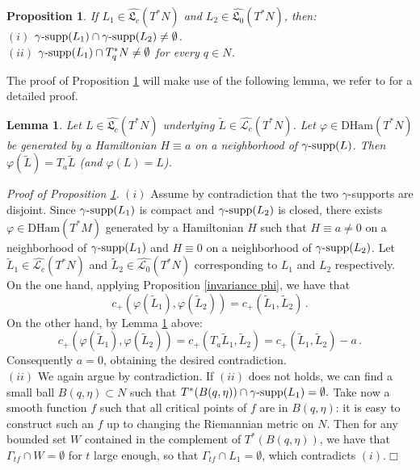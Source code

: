 \documentclass{article}
\newcommand{\1}{\mathbbm{1}}
\newtheorem{lem}[thm]{Lemma}
\newtheorem{prp}[thm]{Proposition}
\theoremstyle{remark}
\begin{document}
{{\begin{prp} \label{no empty}
If $L_1 \in \widehat{\mathfrak{L}_c}(T^*N)$ and $L_2 \in \widehat{\mathfrak{L}_0}(T^*N)$, then: \\
$(i)$ $\gamma\textnormal{-supp}(L_1) \cap \gamma\textnormal{-supp}(L_2) \ne \emptyset$. \\
$(ii)$ $\gamma\textnormal{-supp}(L_1) \cap T^*_qN \ne \emptyset$ for every $q \in N$.
\end{prp}
\noindent The proof of Proposition \ref{no empty} will make use of the following lemma, we refer to \cite[Lemma 6.12]{vit22} for a detailed proof. 
\begin{lem}\label{lem:hamTraCom}
Let $L \in \widehat{\mathfrak{L}_c}(T^*N)$ underlying $\tilde{L} \in \widehat{\mathscr{L}_c}(T^*N)$. Let $\varphi \in \mathrm{DHam}(T^*N)$ be generated by a Hamiltonian $H \equiv a$ on a neighborhood of $\gamma\textnormal{-supp}(L)$. Then $\varphi(\tilde{L}) = T_a\tilde{L}$ (and $\varphi(L) = L$).
\end{lem}
\noindent \textit{Proof of Proposition \ref{no empty}}.  $(i)$ Assume by contradiction that the two $\gamma$-supports are disjoint. Since $\gamma\textnormal{-supp}(L_1)$ is compact and $\gamma\textnormal{-supp}(L_2)$ is closed, there exists $\varphi \in \mathrm{DHam}(T^*M)$ generated by a Hamiltonian $H$ such that $H \equiv a \ne 0$ on a neighborhood of $\gamma\textnormal{-supp}(L_1)$ and $H \equiv 0$ on a neighborhood of $\gamma\textnormal{-supp}(L_2)$. Let $\tilde{L}_1 \in \widehat{\mathscr{L}_c}(T^*N)$ and $\tilde{L}_2 \in \widehat{\mathscr{L}_0}(T^*N)$ corresponding to $L_1$ and $L_2$ respectively. On the one hand, applying Proposition \ref{invariance phi}, we have that
$$c_+(\varphi(\tilde{L}_1),\varphi(\tilde{L}_2)) = c_+(\tilde{L}_1,\tilde{L}_2)\, .$$
On the other hand, by Lemma \ref{lem:hamTraCom} above:
$$c_+(\varphi(\tilde{L}_1),\varphi(\tilde{L}_2)) = c_+(T_a \tilde{L}_1,\tilde{L}_2) = c_+(\tilde{L}_1,\tilde{L}_2)-a \, .$$
Consequently $a = 0$, obtaining the desired contradiction. \\
$(ii)$ We again argue by contradiction. If $(ii)$ does not holds, we can find a small ball $B(q,\eta)\subset N$ such that 
$T^*(B(q,\eta)) \cap \gamma\textnormal{-supp}(L_1) = \emptyset.$ Take now a smooth function $f$ such that all critical points of $f$ are in $B(q,\eta)$: it is easy to construct such an $f$ up to changing the Riemannian metric on $N$. Then for any bounded set $W$ contained in the complement of $T^*
(B(q,\eta))$, we have that $\Gamma_{tf} \cap W = \emptyset$ for $t$ large enough, so that $\Gamma_{t f} \cap L_1 = \emptyset$, which contradicts $(i)$.\hfill$\Box$
}}
\end{document}
